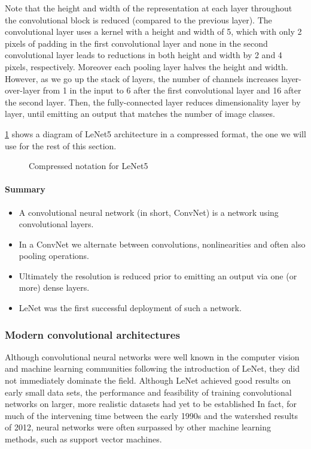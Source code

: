 Note that the height and width of the representation at each layer throughout the convolutional block is reduced (compared to the previous layer). The convolutional layer uses a kernel with a height and width of 5, which with only  2  pixels of padding in the first convolutional layer and none in the second convolutional layer leads to reductions in both height and width by 2 and 4 pixels, respectively. Moreover each pooling layer halves the height and width. However, as we go up the stack of layers, the number of channels increases layer-over-layer from 1 in the input to 6 after the first convolutional layer and 16 after the second layer. Then, the fully-connected layer reduces dimensionality layer by layer, until emitting an output that matches the number of image classes.

\cref{fig:lenet-vert} shows a diagram of LeNet5 architecture in a compressed format, the one we will use for the rest of this section.

\begin{figure}[hpt]
	\centering
	
	\caption{Compressed notation for LeNet5}
	\label{fig:lenet-vert}
\end{figure}


\paragraph{Summary}

\begin{itemize}
    \item A convolutional neural network (in short, ConvNet) is a network using convolutional layers.
    \item In a ConvNet we alternate between convolutions, nonlinearities and often also pooling operations.
    \item Ultimately the resolution is reduced prior to emitting an output via one (or more) dense layers.
    \item LeNet was the first successful deployment of such a network.
\end{itemize}

\subsubsection{Modern convolutional architectures}\label{subsubsec:modern_cnn}

Although convolutional neural networks were well known in the computer vision and machine learning communities following the introduction of LeNet, they did not immediately dominate the field. Although LeNet achieved good results on early small data sets, the performance and feasibility of training convolutional networks on larger, more realistic datasets had yet to be established
In fact, for much of the intervening time between the early 1990s and the watershed results of 2012, neural networks were often surpassed by other machine learning methods, such as support vector machines.

